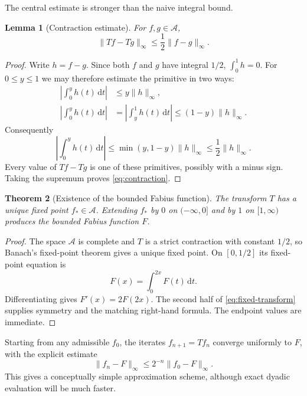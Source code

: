 \documentclass[11pt,oneside]{article}
\newtheorem{theorem}{Theorem}[section]
\newtheorem{lemma}[theorem]{Lemma}
\theoremstyle{definition}
\theoremstyle{remark}
\newcommand{\dd}{\,\mathrm d}
\begin{document}
The central estimate is stronger than the naive integral bound.

\begin{lemma}[Contraction estimate]
For $f,g\in\mathcal A$,
\begin{equation}
 \|Tf-Tg\|_\infty\le\frac12\|f-g\|_\infty.                \label{eq:contraction}
\end{equation}
\end{lemma}

\begin{proof}
Write $h=f-g$.  Since both $f$ and $g$ have integral $1/2$,
$\int_0^1h=0$.  For $0\le y\le1$ we may therefore estimate the primitive in two ways:
\begin{align*}
 \left|\int_0^y h(t)\dd t\right|
 &\le y\|h\|_\infty,\\
 \left|\int_0^y h(t)\dd t\right|
 &=\left|\int_y^1h(t)\dd t\right|
 \le(1-y)\|h\|_\infty.
\end{align*}
Consequently
\begin{equation*}
 \left|\int_0^yh(t)\dd t\right|
 \le\min(y,1-y)\|h\|_\infty\le\frac12\|h\|_\infty.
\end{equation*}
Every value of $Tf-Tg$ is one of these primitives, possibly with a minus sign.  Taking the
supremum proves \eqref{eq:contraction}.
\end{proof}

\begin{theorem}[Existence of the bounded Fabius function]
The transform $T$ has a unique fixed point $f_\ast\in\mathcal A$.  Extending $f_\ast$ by
$0$ on $(-\infty,0]$ and by $1$ on $[1,\infty)$ produces the bounded Fabius function $F$.
\end{theorem}

\begin{proof}
The space $\mathcal A$ is complete and $T$ is a strict contraction with constant $1/2$, so
Banach's fixed-point theorem gives a unique fixed point.  On $[0,1/2]$ its fixed-point
equation is
\begin{equation}
 F(x)=\int_0^{2x}F(t)\dd t.                               \label{eq:F-integral-equation}
\end{equation}
Differentiating gives $F'(x)=2F(2x)$.  The second half of
\eqref{eq:fixed-transform} supplies symmetry and the matching right-hand formula.  The
endpoint values are immediate.
\end{proof}

Starting from any admissible $f_0$, the iterates $f_{n+1}=Tf_n$ converge uniformly to $F$,
with the explicit estimate
\begin{equation}
 \|f_n-F\|_\infty\le 2^{-n}\|f_0-F\|_\infty.             \label{eq:fixed-iteration-rate}
\end{equation}
This gives a conceptually simple approximation scheme, although exact dyadic evaluation will
be much faster.
\end{document}
